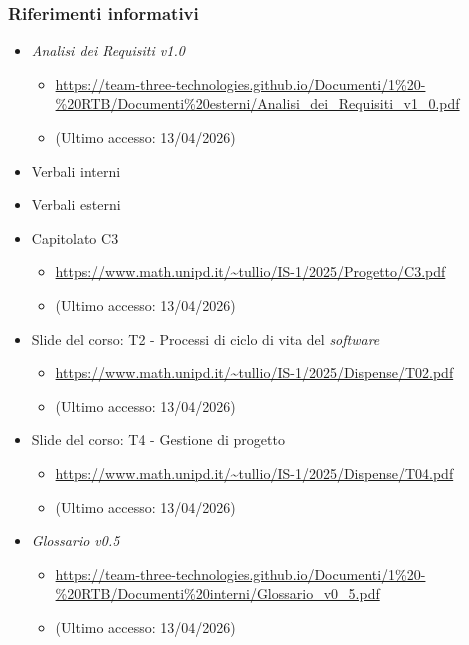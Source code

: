 \documentclass[a4paper,12pt]{article}
\begin{document}
{{            \subsubsection{Riferimenti informativi} {
                \begin{itemize}
                \item \textit{Analisi dei Requisiti v1.0}
                \begin{itemize}
                    \item \url{https://team-three-technologies.github.io/Documenti/1%20-%20RTB/Documenti%20esterni/Analisi_dei_Requisiti_v1_0.pdf}
                    \item[] (Ultimo accesso: 13/04/2026)
                \end{itemize}
                \item Verbali interni
                \item Verbali esterni
                \item Capitolato C3
                \begin{itemize}
                    \item \url{https://www.math.unipd.it/~tullio/IS-1/2025/Progetto/C3.pdf}
                    \item[] (Ultimo accesso: 13/04/2026)
                \end{itemize}
                \item Slide del corso: T2 - Processi di ciclo di vita del \textit{software}
                \begin{itemize}
                    \item \url{https://www.math.unipd.it/~tullio/IS-1/2025/Dispense/T02.pdf}
                    \item[] (Ultimo accesso: 13/04/2026)
                \end{itemize}
                \item Slide del corso: T4 - Gestione di progetto
                \begin{itemize}
                    \item \url{https://www.math.unipd.it/~tullio/IS-1/2025/Dispense/T04.pdf}
                    \item[] (Ultimo accesso: 13/04/2026)
                \end{itemize}
                \item \textit{Glossario v0.5}
                \begin{itemize}
                    \item \url{https://team-three-technologies.github.io/Documenti/1%20-%20RTB/Documenti%20interni/Glossario_v0_5.pdf}
                    \item[] (Ultimo accesso: 13/04/2026)
                \end{itemize}
            \end{itemize}
            }
        }
    }
    
\end{document}
